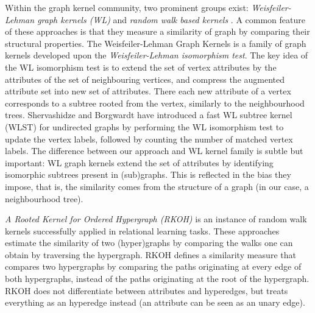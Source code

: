 Within the graph kernel community, two prominent groups exist:  \textit{Weisfeiler-Lehman graph kernels (WL)} \cite{Shervashidze2011,shervashidze09fastsubtree,FrasconiCRG14,haussler99convolution,ICPR-2014-BaiRH}  and \textit{random walk based kernels} \cite{WachmanK07,Lovasz1996}.
A common feature of these approaches is that they measure a similarity of graph by comparing their structural properties.
The Weisfeiler-Lehman Graph Kernels is a family of graph kernels developed upon the \textit{Weisfeiler-Lehman isomorphism test}.
The key idea of the WL isomorphism test is to extend the set of vertex attributes by the attributes of the set of neighbouring vertices, and compress the augmented attribute set into new set of attributes.
There each new attribute of a vertex corresponds to a subtree rooted from the vertex, similarly to the neighbourhood trees.
Shervashidze and Borgwardt have introduced a fast WL subtree kernel (WLST) \cite{shervashidze09fastsubtree} for undirected graphs by performing the WL isomorphism test to update the vertex labels, followed by counting the number of matched vertex labels.
The difference between our approach and WL kernel family is subtle but important: WL graph kernels extend the set of attributes by identifying isomorphic subtrees present in (sub)graphs.
This is reflected in the bias they impose, that is, the similarity comes from the structure of a graph (in our case, a neighbourhood tree).


\textit{A Rooted Kernel for Ordered Hypergraph (RKOH)} \cite{WachmanK07} is an instance of random walk kernels successfully applied in relational learning tasks.
These approaches estimate the similarity of two (hyper)graphs by comparing the walks one can obtain by traversing the hypergraph.
RKOH defines a similarity measure that compares two hypergraphs by comparing the paths originating at every edge of both hypergraphs, instead of the paths originating at the root of the hypergraph.
RKOH does not differentiate between attributes and hyperedges, but treats everything as an hyperedge instead (an attribute can be seen as an unary edge).



